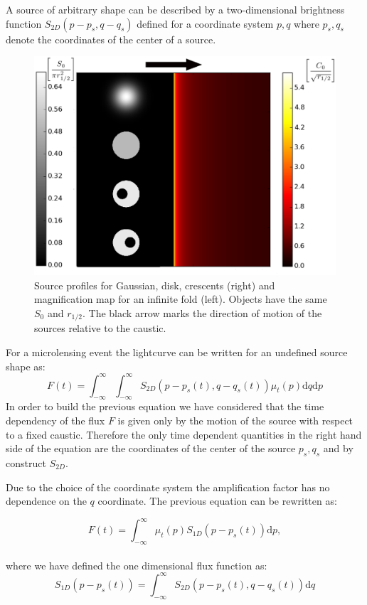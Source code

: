 \documentclass[usenatbib]{mn2e}
\begin{document}
A source of arbitrary shape can be described by a two-dimensional brightness function $S_{2D}(p - p_s, q - q_s)$ defined for a coordinate system $p,q$ where $p_s, q_s$ denote the coordinates of the center of a source.

\begin{figure}
\includegraphics[width = .49\textwidth]{figures/infinite_fold_ar.eps}
\caption{\label{fig:infinite_fold} Source profiles for Gaussian, disk,
  crescents (right) and magnification map for an infinite fold
  (left). Objects have the same $S_{0}$ and $r_{1/2}$. The black arrow marks the direction of motion of the
sources relative to the caustic.}
\end{figure}

For a microlensing event the lightcurve can be written for an
undefined source shape as:
\begin{equation}
 F(t) = \int_{-\infty}^\infty \int_{-\infty}^\infty S_{2D}(p-p_s(t), q-q_s(t)) \mu_t(p) \mathrm{d}q \mathrm{d}p
 \label{eqn:ft2d}
\end{equation}
In order to build the previous equation we have considered that the
time dependency of the flux $F$ is given only by the motion of the
source with respect to a fixed caustic. Therefore the only time
dependent quantities in the right hand side of the equation are the
coordinates of the center of the source $p_s,q_s$ and by construct
$S_{2D}$.

Due to the choice of the coordinate system the amplification factor 
has no dependence on the $q$ coordinate. The previous equation can be rewritten as:

\begin{equation}
 F(t) 
= \int_{-\infty}^\infty  \mu_t(p) S_{1D}\left(p-p_s(t)\right) \mathrm{d}p,
\label{eqn:ft}
\end{equation}
\\
where we have defined the one dimensional flux function as:
\begin{equation}
 S_{1D}(p-p_s(t)) = \int_{-\infty}^\infty S_{2D}(p-p_s(t), q-q_s(t)) \mathrm{d}q
\end{equation}
\end{document}
